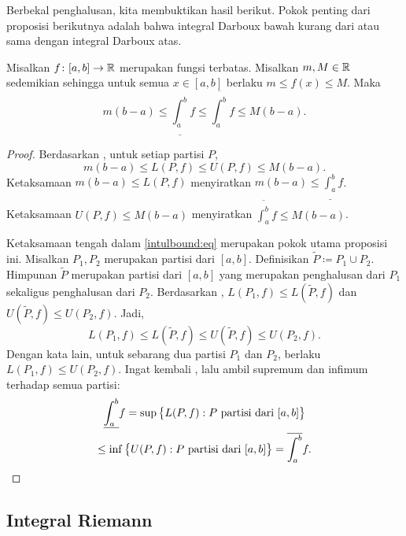 Berbekal penghalusan, kita membuktikan hasil berikut.
Pokok penting dari proposisi berikutnya adalah bahwa
integral Darboux bawah kurang dari atau sama dengan integral Darboux
atas.

\begin{prop} \label{intulbound:prop}
Misalkan $f \colon [a,b] \to {\mathbb{R}}$ merupakan fungsi terbatas.  Misalkan $m, M \in {\mathbb{R}}$ 
sedemikian sehingga untuk semua $x \in [a,b]$ berlaku $m \leq f(x) \leq M$.  Maka
\begin{equation}
\label{intulbound:eq}
m(b-a) \leq
\underline{\int_a^b} f \leq \overline{\int_a^b} f
\leq M(b-a) .
\end{equation}
\end{prop}

\begin{proof}
Berdasarkan , untuk setiap partisi $P$,
\begin{equation*}
m(b-a) \leq L(P,f) \leq U(P,f) \leq M(b-a).
\end{equation*}
Ketaksamaan
$m(b-a) \leq L(P,f)$ menyiratkan $m(b-a) \leq \underline{\int_a^b} f$.
Ketaksamaan
$U(P,f) \leq M(b-a)$ menyiratkan $\overline{\int_a^b} f \leq M(b-a)$.

Ketaksamaan tengah dalam
\eqref{intulbound:eq} merupakan pokok utama proposisi ini.
Misalkan $P_1, P_2$ merupakan partisi dari $[a,b]$.  Definisikan 
$\widetilde{P} \coloneqq P_1 \cup P_2$.
Himpunan $\widetilde{P}$ merupakan partisi dari $[a,b]$ yang
merupakan penghalusan dari $P_1$ sekaligus penghalusan dari $P_2$.
Berdasarkan ,
$L(P_1,f) \leq L(\widetilde{P},f)$ dan
$U(\widetilde{P},f) \leq U(P_2,f)$.  Jadi,
\begin{equation*}
L(P_1,f) \leq L(\widetilde{P},f) \leq U(\widetilde{P},f) \leq U(P_2,f) .
\end{equation*}
Dengan kata lain, untuk sebarang dua partisi $P_1$ dan $P_2$, berlaku
$L(P_1,f) \leq U(P_2,f)$.  
Ingat kembali , lalu ambil supremum dan
infimum terhadap semua partisi:
\begin{multline*}
\underline{\int_a^b} f = 
\sup \, \bigl\{ L(P,f) : P \text{ partisi dari } [a,b] \bigr\}
\\
\leq
\inf \, \bigl\{ U(P,f) : P \text{ partisi dari } [a,b] \bigr\}
=
\overline{\int_a^b} f . \qedhere
\end{multline*}
\end{proof}

\subsection{Integral Riemann}

